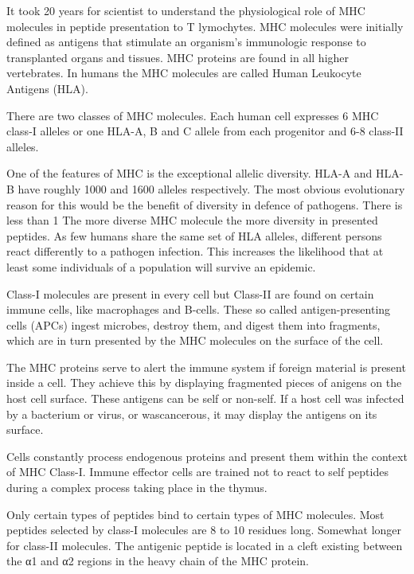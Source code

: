 
It took 20 years for scientist to understand the  physiological role of MHC molecules in peptide presentation to T lymochytes. 
MHC molecules were initially defined as antigens that stimulate an organism’s immunologic response to transplanted organs and tissues. MHC proteins are found in all higher vertebrates. 
In humans the MHC molecules are called Human Leukocyte Antigens (HLA).

There are two classes of MHC molecules. Each human cell expresses 6 MHC class-I alleles or one HLA-A, B and C allele from each progenitor and 6-8 class-II alleles.

One of the features of MHC is the exceptional allelic diversity. HLA-A and HLA-B have roughly 1000 and 1600 alleles respectively. 
The most obvious evolutionary reason for this would be the benefit of diversity in defence of pathogens. 
There is less than 1%
The more diverse MHC molecule the more diversity in presented peptides. As few humans share the same set of HLA alleles, different persons react differently to a pathogen infection. 
This increases the likelihood that at least some individuals of a population will survive an epidemic.

Class-I molecules are present in every cell but Class-II are found on certain immune cells, like macrophages and B-cells. 
These so called antigen-presenting cells (APCs) ingest microbes, destroy them, and digest them into fragments, which are in turn presented by the MHC molecules on the surface of the cell.

The MHC proteins serve to alert the immune system if foreign material is present inside a cell. 
They achieve this by displaying fragmented pieces of anigens on the host cell surface. These antigens can be self or non-self. 
If a host cell was infected by a bacterium or virus, or wascancerous, it may  display the antigens on its surface.

Cells constantly process endogenous proteins and present them within the context of MHC Class-I. 
Immune effector cells are trained not to react to self peptides during a complex process taking place in the thymus.

Only certain types of peptides bind to certain types of MHC molecules. Most peptides selected by class-I molecules are 8 to 10 residues long. 
Somewhat longer for class-II molecules. The antigenic peptide is located in a cleft existing between the α1 and α2 regions in the heavy chain of the MHC protein.


